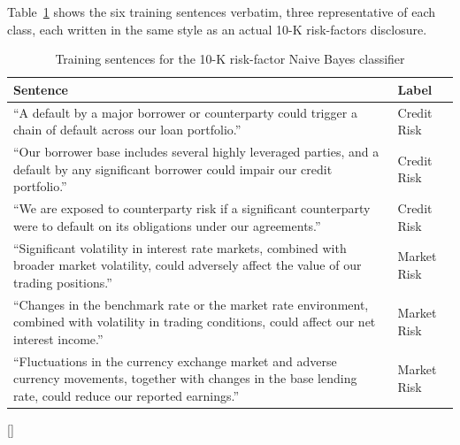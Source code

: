 \documentclass[../ai_in_finance]{subfiles}
\begin{document}
Table~\ref{tab:nb_training_sentences} shows the six training sentences verbatim, three representative of each class, each written in the same style as an actual 10-K risk-factors disclosure.

\begin{table}[htbp]
\centering
\begin{lrbox}{\bookmeasuredbox}
\begin{tabular}{p{10cm}l}
\toprule
Sentence & Label \\
\midrule
``A default by a major borrower or counterparty could trigger a chain of default across our loan portfolio.'' & Credit Risk \\
``Our borrower base includes several highly leveraged parties, and a default by any significant borrower could impair our credit portfolio.'' & Credit Risk \\
``We are exposed to counterparty risk if a significant counterparty were to default on its obligations under our agreements.'' & Credit Risk \\
``Significant volatility in interest rate markets, combined with broader market volatility, could adversely affect the value of our trading positions.'' & Market Risk \\
``Changes in the benchmark rate or the market rate environment, combined with volatility in trading conditions, could affect our net interest income.'' & Market Risk \\
``Fluctuations in the currency exchange market and adverse currency movements, together with changes in the base lending rate, could reduce our reported earnings.'' & Market Risk \\
\bottomrule
\end{tabular}
\end{lrbox}
\ifdim\wd\bookmeasuredbox<0.65\linewidth
\setlength{\bookcapwidth}{0.65\linewidth}
\else
\setlength{\bookcapwidth}{\wd\bookmeasuredbox}
\fi
{}[\bookcapwidth]{
\usebox{\bookmeasuredbox}
}{
\caption{Training sentences for the 10-K risk-factor Naive Bayes classifier}
\label{tab:nb_training_sentences}
}
\end{table}
\end{document}

